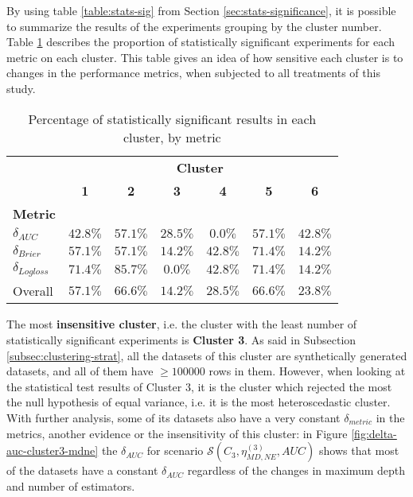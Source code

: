 By using table \ref{table:stats-sig} from Section \ref{sec:stats-significance}, it is possible to summarize the results of the experiments grouping by the cluster number. Table \ref{table:stats-clusters} describes the proportion of statistically significant experiments for each metric on each cluster. This table gives an idea of how sensitive each cluster is to changes in the performance metrics, when subjected to all treatments of this study.

\begin{table}[H]
    \centering
    \begin{tabular}{l|cccccc}
              & \multicolumn{6}{c}{\textbf{\large Cluster}}                                    \\
              & \textbf{1} & \textbf{2} & \textbf{3} & \textbf{4} & \textbf{5} & \textbf{6}    \\
    \textbf{\large Metric} &          &          &          &          &          &          \\
    \midrule
    $\delta_{AUC}$         & $42.8\%$ & $57.1\%$ & $28.5\%$ & $0.0\%$  & $57.1\%$ & $42.8\%$ \\
    $\delta_{Brier}$       & $57.1\%$ & $57.1\%$ & $14.2\%$ & $42.8\%$ & $71.4\%$ & $14.2\%$ \\
    $\delta_{Logloss}$     & $71.4\%$ & $85.7\%$ & $0.0\%$  & $42.8\%$ & $71.4\%$ & $14.2\%$ \\
    \midrule
                   Overall & $57.1\%$ & $66.6\%$ & $14.2\%$ & $28.5\%$ & $66.6\%$ & $23.8\%$ 
    \end{tabular}
    \caption{Percentage of statistically significant results in each cluster, by metric}
    \label{table:stats-clusters}
\end{table}

The most \textbf{insensitive cluster}, i.e. the cluster with the least number of statistically significant experiments is \textbf{Cluster 3}. As said in Subsection \ref{subsec:clustering-strat}, all the datasets of this cluster are synthetically generated datasets, and all of them have $\geq 100000$ rows in them.  However, when looking at the statistical test results of Cluster 3, it is  the cluster which rejected the most the null hypothesis of equal variance, i.e. it is the most heteroscedastic cluster. With further analysis, some of its datasets also have a very constant $\delta_{metric}$ in the metrics, another evidence or the insensitivity of this cluster: in Figure \ref{fig:delta-auc-cluster3-mdne} the $\delta_{AUC}$ for scenario $\mathcal{S}(C_3, \eta^{(3)}_{MD, NE}, AUC)$ shows that most of the datasets have a constant $\delta_{AUC}$ regardless of the changes in maximum depth and number of estimators.

